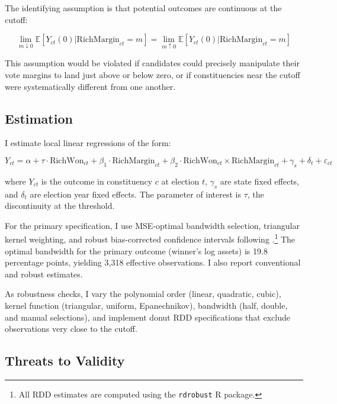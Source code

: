 \documentclass[12pt]{article}
\newcommand{\E}{\mathbb{E}}
\begin{document}
The identifying assumption is that potential outcomes are continuous at the cutoff:

\begin{equation}
\lim_{m \downarrow 0} \E[Y_{ct}(0) | \text{RichMargin}_{ct} = m] = \lim_{m \uparrow 0} \E[Y_{ct}(0) | \text{RichMargin}_{ct} = m]
\end{equation}

This assumption would be violated if candidates could precisely manipulate their vote margins to land just above or below zero, or if constituencies near the cutoff were systematically different from one another.

\subsection{Estimation}

I estimate local linear regressions of the form:

\begin{equation}
Y_{ct} = \alpha + \tau \cdot \text{RichWon}_{ct} + \beta_1 \cdot \text{RichMargin}_{ct} + \beta_2 \cdot \text{RichWon}_{ct} \times \text{RichMargin}_{ct} + \gamma_s + \delta_t + \varepsilon_{ct}
\label{eq:main}
\end{equation}

\noindent where $Y_{ct}$ is the outcome in constituency $c$ at election $t$, $\gamma_s$ are state fixed effects, and $\delta_t$ are election year fixed effects. The parameter of interest is $\tau$, the discontinuity at the threshold.

For the primary specification, I use MSE-optimal bandwidth selection, triangular kernel weighting, and robust bias-corrected confidence intervals following \citet{calonico2014robust, calonico2020rdrobust}.\footnote{All RDD estimates are computed using the \texttt{rdrobust} R package.} The optimal bandwidth for the primary outcome (winner's log assets) is 19.8 percentage points, yielding 3,318 effective observations. I also report conventional and robust estimates.

As robustness checks, I vary the polynomial order (linear, quadratic, cubic), kernel function (triangular, uniform, Epanechnikov), bandwidth (half, double, and manual selections), and implement donut RDD specifications that exclude observations very close to the cutoff.

\subsection{Threats to Validity}
\end{document}
